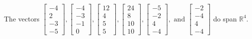\begin{exercise}
\begin{exerciseStatement}
  \end{exerciseStatement}
  \begin{exerciseAnswer}
   The vectors \(\left[\begin{array}{r}
-4 \\
2 \\
-3 \\
-5
\end{array}\right] , \left[\begin{array}{r}
-4 \\
-3 \\
-1 \\
0
\end{array}\right] , \left[\begin{array}{r}
12 \\
4 \\
5 \\
5
\end{array}\right] , \left[\begin{array}{r}
24 \\
8 \\
10 \\
10
\end{array}\right] , \left[\begin{array}{r}
-5 \\
-2 \\
4 \\
-4
\end{array}\right] , \text{ and } \left[\begin{array}{r}
-2 \\
-4 \\
4 \\
-4
\end{array}\right]\) 
  	 do  
	span \(\mathbb{R}^4\).
  


  \end{exerciseAnswer}
\end{exercise}
